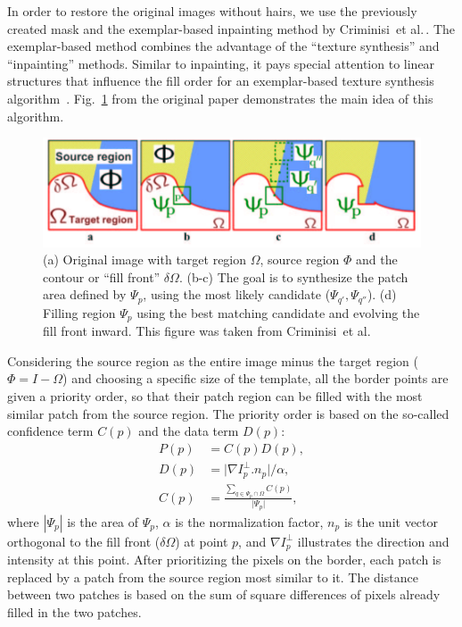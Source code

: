 In order to restore the original images without hairs, we use the previously created mask and the exemplar-based inpainting method by Criminisi~et al.\,\cite{criminisi2003object}.
The exemplar-based method combines the advantage of the ``texture synthesis'' and ``inpainting'' methods.
Similar to inpainting, it pays special attention to linear structures that influence the fill order for an exemplar-based texture synthesis algorithm~\cite{criminisi2003object}.
Fig.~\ref{fig:exemplar-based} from the original paper demonstrates the main idea of this algorithm.
\begin{figure}[t]
\centering
\includegraphics[scale=0.4]{Chapter3/Figures/Exemplar-based-criminisi.png}
\caption[Exemplar inpainting]{(a) Original image with target region $\Omega$, source region $\Phi$ and the contour or ``fill front'' $\delta \Omega$. (b-c) The goal is to synthesize the patch area defined by $\Psi_{p}$, using the most likely candidate ($\Psi_{q'}, \Psi_{q''}$). (d) Filling region $\Psi_{p}$ using the best matching candidate and evolving the fill front inward. This figure was taken from Criminisi~et al.\,\cite{criminisi2003object}}
\label{fig:exemplar-based}
\end{figure}

Considering the source region as the entire image minus the target region ($\Phi = I - \Omega$) and choosing a specific size of the template, all the border points are given a priority order, so that their patch region can be filled with the most similar patch from the source region.
The priority order is based on the so-called confidence term $C(p)$ and the data term $D(p)$:
\begin{subequations}
\begin{align}
P(p) & = C(p)D(p),\\
D(p) & = \vert \nabla I_{p}^{\bot}.n_{p} \vert /\alpha,\\
C(p) & = \frac{\sum\limits_{q\in\Psi_{p} \cap \Omega }C(p)}{\vert \Psi_{p}\vert},
\end{align}
\end{subequations}
\noindent where $|\Psi_{p}|$ is the area of $\Psi_{p}$, $\alpha$ is the normalization factor, $n_{p}$ is the unit vector orthogonal to the fill front ($\delta\Omega$) at point $p$, and $\nabla I_{p}^{\bot}$ illustrates the direction and intensity at this point.
After prioritizing the pixels on the border, each patch is replaced by a patch from the source region most similar to it.
The distance between two patches is based on the sum of square differences of pixels already filled in the two patches.

